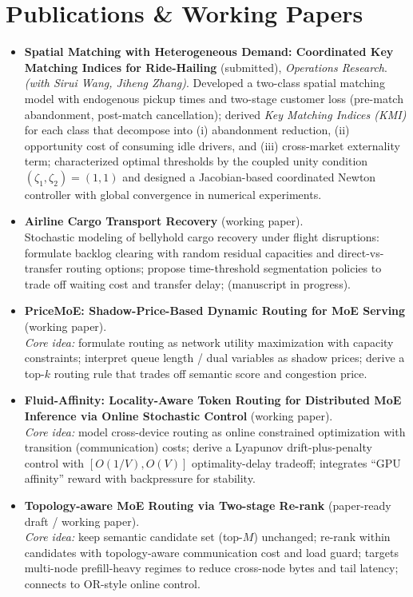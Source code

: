 \documentclass[11pt,a4paper]{article}
\begin{document}
\section*{Publications \& Working Papers}
\begin{itemize}
  \item \textbf{Spatial Matching with Heterogeneous Demand: Coordinated Key Matching Indices for Ride-Hailing} (submitted), \emph{Operations Research}.\\
  \emph{(with Sirui Wang, Jiheng Zhang)}. Developed a two-class spatial matching model with endogenous pickup times and two-stage customer loss (pre-match abandonment, post-match cancellation); derived \emph{Key Matching Indices (KMI)} for each class that decompose into (i) abandonment reduction, (ii) opportunity cost of consuming idle drivers, and (iii) cross-market externality term; characterized optimal thresholds by the coupled unity condition $(\zeta_1,\zeta_2)=(1,1)$ and designed a Jacobian-based coordinated Newton controller with global convergence in numerical experiments.

  \item \textbf{Airline Cargo Transport Recovery} (working paper).\\
  Stochastic modeling of bellyhold cargo recovery under flight disruptions: formulate backlog clearing with random residual capacities and direct-vs-transfer routing options; propose time-threshold segmentation policies to trade off waiting cost and transfer delay; (manuscript in progress).

  \item \textbf{PriceMoE: Shadow-Price-Based Dynamic Routing for MoE Serving} (working paper). \\
  \emph{Core idea:} formulate routing as network utility maximization with capacity constraints; interpret queue length / dual variables as shadow prices; derive a top-$k$ routing rule that trades off semantic score and congestion price.

  \item \textbf{Fluid-Affinity: Locality-Aware Token Routing for Distributed MoE Inference via Online Stochastic Control} (working paper). \\
  \emph{Core idea:} model cross-device routing as online constrained optimization with transition (communication) costs; derive a Lyapunov drift-plus-penalty control with $[O(1/V), O(V)]$ optimality-delay tradeoff; integrates ``GPU affinity'' reward with backpressure for stability.

  \item \textbf{Topology-aware MoE Routing via Two-stage Re-rank} (paper-ready draft / working paper). \\
  \emph{Core idea:} keep semantic candidate set (top-$M$) unchanged; re-rank within candidates with topology-aware communication cost and load guard; targets multi-node prefill-heavy regimes to reduce cross-node bytes and tail latency; connects to OR-style online control.
\end{itemize}
\end{document}
